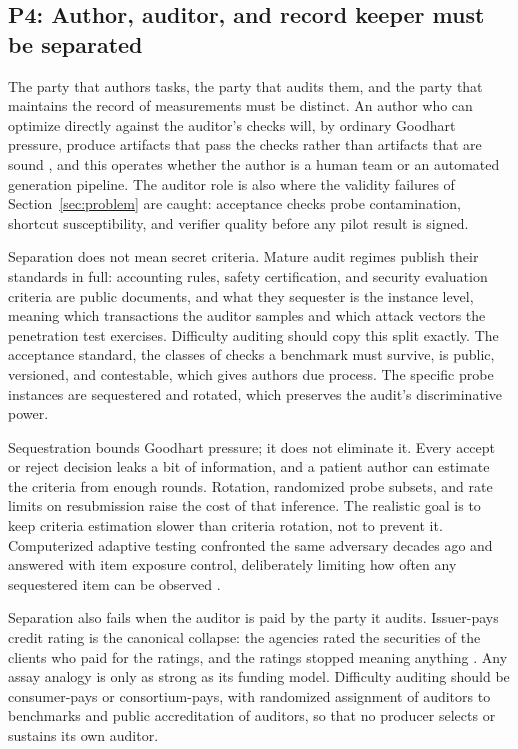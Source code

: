 \documentclass[11pt]{article}
\begin{document}
\subsection{P4: Author, auditor, and record keeper must be separated}

The party that authors tasks, the party that audits them, and the party that maintains the record of measurements must be distinct. An author who can optimize directly against the auditor's checks will, by ordinary Goodhart pressure, produce artifacts that pass the checks rather than artifacts that are sound \citep{zhao2026goodhart}, and this operates whether the author is a human team or an automated generation pipeline. The auditor role is also where the validity failures of Section~\ref{sec:problem} are caught: acceptance checks probe contamination, shortcut susceptibility, and verifier quality before any pilot result is signed.

Separation does not mean secret criteria. Mature audit regimes publish their standards in full: accounting rules, safety certification, and security evaluation criteria are public documents, and what they sequester is the instance level, meaning which transactions the auditor samples and which attack vectors the penetration test exercises. Difficulty auditing should copy this split exactly. The acceptance standard, the classes of checks a benchmark must survive, is public, versioned, and contestable, which gives authors due process. The specific probe instances are sequestered and rotated, which preserves the audit's discriminative power.

Sequestration bounds Goodhart pressure; it does not eliminate it. Every accept or reject decision leaks a bit of information, and a patient author can estimate the criteria from enough rounds. Rotation, randomized probe subsets, and rate limits on resubmission raise the cost of that inference. The realistic goal is to keep criteria estimation slower than criteria rotation, not to prevent it. Computerized adaptive testing confronted the same adversary decades ago and answered with item exposure control, deliberately limiting how often any sequestered item can be observed \citep{way1998protecting, vanderlinden2003alternatives}.

Separation also fails when the auditor is paid by the party it audits. Issuer-pays credit rating is the canonical collapse: the agencies rated the securities of the clients who paid for the ratings, and the ratings stopped meaning anything \citep{white2010rating}. Any assay analogy is only as strong as its funding model. Difficulty auditing should be consumer-pays or consortium-pays, with randomized assignment of auditors to benchmarks and public accreditation of auditors, so that no producer selects or sustains its own auditor.
\end{document}
